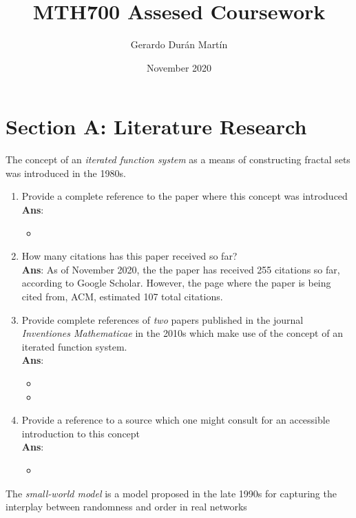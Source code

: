 \documentclass[11pt]{article}
\title{MTH700 Assesed Coursework}
\author{Gerardo Durán Martín}
\date{November 2020}
\begin{document}
\maketitle

\section*{Section A: Literature Research}
The concept of an \textit{iterated function system} as a means of constructing fractal sets was introduced in the 1980s.
\begin{enumerate}[label=(\alph*)]
	\item Provide a complete reference to the paper where this concept was introduced \\ \textbf{Ans}:
	\begin{itemize}
	\item {}
	\end{itemize}
	\item How many citations has this paper received so far? \\ \textbf{Ans}: As of November 2020, the the paper has received 255 citations so far, according to Google Scholar. However, the page where the paper is being cited from, ACM, estimated 107 total citations. 
	\item Provide complete references of \textit{two} papers published in the journal \textit{Inventiones Mathematicae} in the 2010s which make use of the concept of an iterated function system. \\ \textbf{Ans}:
	\begin{itemize}
		\item {}
		\item {}
	\end{itemize}
	\item Provide a reference to a source which one might consult for an accessible introduction to this concept \\ \textbf{Ans}:
	\begin{itemize}
		\item {}
	\end{itemize}
\end{enumerate}

The \textit{small-world model} is a model proposed in the late 1990s for capturing the interplay between randomness and order in real networks
\end{document}
